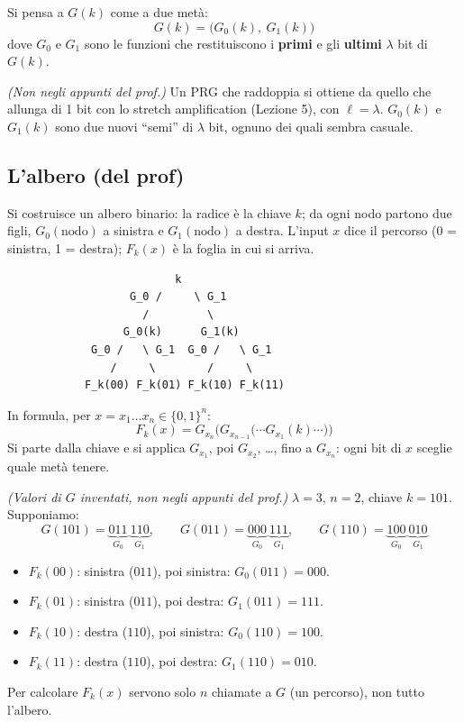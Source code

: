 Si pensa a \(G(k)\) come a due metà:
\[
G(k) = \big(G_0(k),\ G_1(k)\big)
\]
dove \(G_0\) e \(G_1\) sono le funzioni che restituiscono i \textbf{primi} e gli \textbf{ultimi} \(\lambda\) bit di \(G(k)\).

\begin{nota}
\emph{(Non negli appunti del prof.)} Un PRG che raddoppia si ottiene da quello che allunga di 1 bit con lo stretch amplification (Lezione 5), con \(\ell = \lambda\). \(G_0(k)\) e \(G_1(k)\) sono due nuovi ``semi'' di \(\lambda\) bit, ognuno dei quali sembra casuale.
\end{nota}

\subsection{L'albero (del prof)}

\begin{inbreve}
Si costruisce un albero binario: la radice è la chiave \(k\); da ogni nodo partono due figli, \(G_0(\text{nodo})\) a sinistra e \(G_1(\text{nodo})\) a destra. L'input \(x\) dice il percorso (0 = sinistra, 1 = destra); \(F_k(x)\) è la foglia in cui si arriva.
\end{inbreve}

\begin{verbatim}
                          k
                   G_0 /     \ G_1
                     /         \
                  G_0(k)      G_1(k)
             G_0 /   \ G_1  G_0 /   \ G_1
                /     \        /     \
            F_k(00) F_k(01) F_k(10) F_k(11)
\end{verbatim}

In formula, per \(x = x_1 \dots x_n \in \{0,1\}^n\):
\[
F_k(x) = G_{x_n}\Big(G_{x_{n-1}}\big(\cdots G_{x_1}(k) \cdots\big)\Big)
\]
Si parte dalla chiave e si applica \(G_{x_1}\), poi \(G_{x_2}\), …, fino a \(G_{x_n}\): ogni bit di \(x\) sceglie quale metà tenere.

\begin{esempio}
\emph{(Valori di \(G\) inventati, non negli appunti del prof.)} \(\lambda = 3\), \(n = 2\), chiave \(k = 101\). Supponiamo:
\[
G(101) = \underbrace{011}_{G_0}\ \underbrace{110}_{G_1}, \qquad G(011) = \underbrace{000}_{G_0}\ \underbrace{111}_{G_1}, \qquad G(110) = \underbrace{100}_{G_0}\ \underbrace{010}_{G_1}
\]
\begin{itemize}
  \item \(F_k(00)\): sinistra (\(011\)), poi sinistra: \(G_0(011) = 000\).
  \item \(F_k(01)\): sinistra (\(011\)), poi destra: \(G_1(011) = 111\).
  \item \(F_k(10)\): destra (\(110\)), poi sinistra: \(G_0(110) = 100\).
  \item \(F_k(11)\): destra (\(110\)), poi destra: \(G_1(110) = 010\).
\end{itemize}
Per calcolare \(F_k(x)\) servono solo \(n\) chiamate a \(G\) (un percorso), non tutto l'albero.
\end{esempio}

